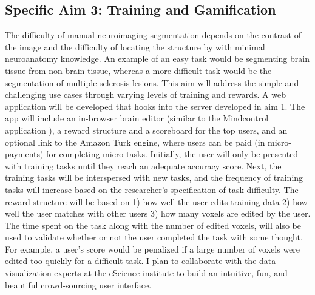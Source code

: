 

\subsection{Specific Aim 3: Training and Gamification}

The difficulty of manual neuroimaging segmentation depends on the contrast of the image and the difficulty of locating the structure by with minimal neuroanatomy knowledge. An example of an easy task would be segmenting brain tissue from non-brain tissue, whereas a more difficult task would be the segmentation of multiple sclerosis lesions. This aim will address the simple and challenging use cases through varying levels of training and rewards. A web application will be developed that hooks into the server developed in aim 1. The app will include an in-browser brain editor (similar to the Mindcontrol application \cite{keshavan2016mindcontrol}), a reward structure and a scoreboard for the top users, and an optional link to the Amazon Turk engine, where users can be paid (in micro-payments) for completing micro-tasks. Initially, the user will only be presented with training tasks until they reach an adequate accuracy score. Next, the training tasks will be interspersed with new tasks, and the frequency of training tasks will increase based on the researcher's specification of task difficulty. The reward structure will be based on 1) how well the user edits training data 2) how well the user matches with other users 3) how many voxels are edited by the user. The time spent on the task along with the number of edited voxels, will also be used to validate whether or not the user completed the task with some thought. For example, a user's score would be penalized if a large number of voxels were edited too quickly for a difficult task. I plan to collaborate with the data visualization experts at the eScience institute to build an intuitive, fun, and beautiful crowd-sourcing user interface.